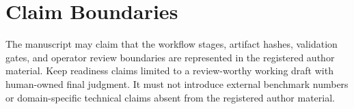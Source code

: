 \section{Claim Boundaries}
The manuscript may claim that the workflow stages, artifact hashes, validation gates, and operator review boundaries are represented in the registered author material. Keep readiness claims limited to a review-worthy working draft with human-owned final judgment. It must not introduce external benchmark numbers or domain-specific technical claims absent from the registered author material.
